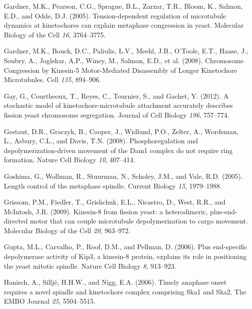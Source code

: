 \documentclass[12pt,a4paper,twoside,openright]{book}
\begin{document}
Gardner, M.K., Pearson, C.G., Sprague, B.L., Zarzar, T.R., Bloom, K.,
Salmon, E.D., and Odde, D.J. (2005). Tension-dependent regulation of
microtubule dynamics at kinetochores can explain metaphase congression
in yeast. Molecular Biology of the Cell \emph{16}, 3764--3775.

Gardner, M.K., Bouck, D.C., Paliulis, L.V., Meehl, J.B., O'Toole, E.T.,
Haase, J., Soubry, A., Joglekar, A.P., Winey, M., Salmon, E.D., et al.
(2008). Chromosome Congression by Kinesin-5 Motor-Mediated Disassembly
of Longer Kinetochore Microtubules. Cell \emph{135}, 894--906.

Gay, G., Courtheoux, T., Reyes, C., Tournier, S., and Gachet, Y. (2012).
A stochastic model of kinetochore-microtubule attachment accurately
describes fission yeast chromosome segregation. Journal of Cell Biology
\emph{196}, 757--774.

Gestaut, D.R., Graczyk, B., Cooper, J., Widlund, P.O., Zelter, A.,
Wordeman, L., Asbury, C.L., and Davis, T.N. (2008). Phosphoregulation
and depolymerization-driven movement of the Dam1 complex do not require
ring formation. Nature Cell Biology \emph{10}, 407--414.

Goshima, G., Wollman, R., Stuurman, N., Scholey, J.M., and Vale, R.D.
(2005). Length control of the metaphase spindle. Current Biology
\emph{15}, 1979--1988.

Grissom, P.M., Fiedler, T., Grishchuk, E.L., Nicastro, D., West, R.R.,
and McIntosh, J.R. (2009). Kinesin-8 from fission yeast: a
heterodimeric, plus-end-directed motor that can couple microtubule
depolymerization to cargo movement. Molecular Biology of the Cell
\emph{20}, 963--972.

Gupta, M.L., Carvalho, P., Roof, D.M., and Pellman, D. (2006). Plus
end-specific depolymerase activity of Kip3, a kinesin-8 protein,
explains its role in positioning the yeast mitotic spindle. Nature Cell
Biology \emph{8}, 913--923.

Hanisch, A., Silljé, H.H.W., and Nigg, E.A. (2006). Timely anaphase
onset requires a novel spindle and kinetochore complex comprising Ska1
and Ska2. The EMBO Journal \emph{25}, 5504--5515.
\end{document}
